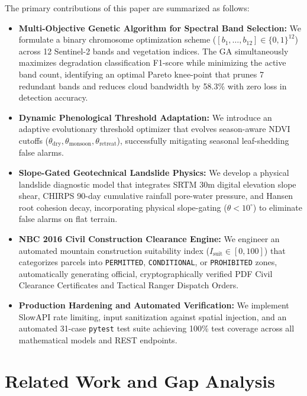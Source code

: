 \documentclass[conference]{IEEEtran}
\begin{document}
The primary contributions of this paper are summarized as follows:
\begin{itemize}
    \item \textbf{Multi-Objective Genetic Algorithm for Spectral Band Selection:} We formulate a binary chromosome optimization scheme ($[b_1, \dots, b_{12}] \in \{0, 1\}^{12}$) across 12 Sentinel-2 bands and vegetation indices. The GA simultaneously maximizes degradation classification F1-score while minimizing the active band count, identifying an optimal Pareto knee-point that prunes 7 redundant bands and reduces cloud bandwidth by 58.3\% with zero loss in detection accuracy.
    \item \textbf{Dynamic Phenological Threshold Adaptation:} We introduce an adaptive evolutionary threshold optimizer that evolves season-aware NDVI cutoffs ($\theta_{\text{dry}}, \theta_{\text{monsoon}}, \theta_{\text{retreat}}$), successfully mitigating seasonal leaf-shedding false alarms.
    \item \textbf{Slope-Gated Geotechnical Landslide Physics:} We develop a physical landslide diagnostic model that integrates SRTM 30m digital elevation slope shear, CHIRPS 90-day cumulative rainfall pore-water pressure, and Hansen root cohesion decay, incorporating physical slope-gating ($\theta < 10^\circ$) to eliminate false alarms on flat terrain.
    \item \textbf{NBC 2016 Civil Construction Clearance Engine:} We engineer an automated mountain construction suitability index ($I_{\text{suit}} \in [0, 100]$) that categorizes parcels into \texttt{PERMITTED}, \texttt{CONDITIONAL}, or \texttt{PROHIBITED} zones, automatically generating official, cryptographically verified PDF Civil Clearance Certificates and Tactical Ranger Dispatch Orders.
    \item \textbf{Production Hardening and Automated Verification:} We implement SlowAPI rate limiting, input sanitization against spatial injection, and an automated 31-case \texttt{pytest} test suite achieving 100\% test coverage across all mathematical models and REST endpoints.
\end{itemize}

\section{Related Work and Gap Analysis}
\end{document}
